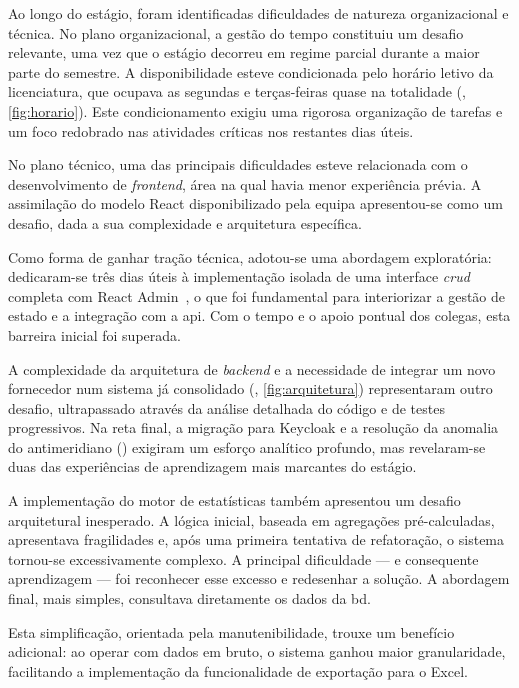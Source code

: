 Ao longo do estágio, foram identificadas dificuldades de natureza organizacional e técnica. No plano organizacional, a gestão do tempo constituiu um desafio relevante, uma vez que o estágio decorreu em regime parcial durante a maior parte do semestre. A disponibilidade esteve condicionada pelo horário letivo da licenciatura, que ocupava as segundas e terças-feiras quase na totalidade (, \autoref{fig:horario}). Este condicionamento exigiu uma rigorosa organização de tarefas e um foco redobrado nas atividades críticas nos restantes dias úteis.

No plano técnico, uma das principais dificuldades esteve relacionada com o desenvolvimento de \textit{frontend}, área na qual havia menor experiência prévia. A assimilação do modelo React disponibilizado pela equipa apresentou-se como um desafio, dada a sua complexidade e arquitetura específica.

Como forma de ganhar tração técnica, adotou-se uma abordagem exploratória: dedicaram-se três dias úteis à implementação isolada de uma interface \textit{\gls{crud}} completa com React Admin~\cite{reactadmin}, o que foi fundamental para interiorizar a gestão de estado e a integração com a \gls{api}. Com o tempo e o apoio pontual dos colegas, esta barreira inicial foi superada.

A complexidade da arquitetura de \textit{backend} e a necessidade de integrar um novo fornecedor num sistema já consolidado (, \autoref{fig:arquitetura}) representaram outro desafio, ultrapassado através da análise detalhada do código e de testes progressivos. Na reta final, a migração para Keycloak e a resolução da anomalia do antimeridiano () exigiram um esforço analítico profundo, mas revelaram-se duas das experiências de aprendizagem mais marcantes do estágio.

A implementação do motor de estatísticas também apresentou um desafio arquitetural inesperado. A lógica inicial, baseada em agregações pré-calculadas, apresentava fragilidades e, após uma primeira tentativa de refatoração, o sistema tornou-se excessivamente complexo. A principal dificuldade — e consequente aprendizagem — foi reconhecer esse excesso e redesenhar a solução. A abordagem final, mais simples, consultava diretamente os dados da \gls{bd}.

Esta simplificação, orientada pela manutenibilidade, trouxe um benefício adicional: ao operar com dados em bruto, o sistema ganhou maior granularidade, facilitando a implementação da funcionalidade de exportação para o Excel.


